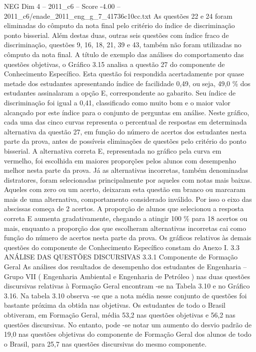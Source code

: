 \begin{textsample}{NEG Dim 4 – 2011\_c6 – Score -4.00 – 2011\_c6/enade\_2011\_eng\_g\_7\_41736c10cc.txt}
As questões 22 e 24 foram eliminadas do cômputo da nota final pelo critério do índice de discriminação ponto bisserial.
Além destas duas, outras seis questões com índice fraco de discriminação, questões 9, 16, 18, 21, 39 e 43, também não foram utilizadas no cômputo da nota final.
A título de exemplo das análises do comportamento das questões objetivas, o Gráfico 3.15 analisa a questão 27 do componente de Conhecimento Específico.
Esta questão foi respondida acertadamente por quase metade dos estudantes apresentando índice de facilidade 0,49, ou seja, 49,0 \% dos estudantes assinalaram a opção E, correspondente ao gabarito.
Seu índice de discriminação foi igual a 0,41, classificado como muito bom e o maior valor alcançado por este índice para o conjunto de perguntas em análise.
Neste gráfico, cada uma das cinco curvas representa o percentual de respostas em determinada alternativa da questão 27, em função do número de acertos dos estudantes nesta parte da prova, antes de possíveis eliminações de questões pelo critério do ponto bisserial.
A alternativa correta E, representada no gráfico pela curva em vermelho, foi escolhida em maiores proporções pelos alunos com desempenho melhor nesta parte da prova.
Já as alternativas incorretas, também denominadas distratores, foram selecionadas principalmente por aqueles com notas mais baixas.
Aqueles com zero ou um acerto, deixaram esta questão em branco ou marcaram mais de uma alternativa, comportamento considerado inválido.
Por isso o eixo das abscissas começa de 2 acertos.
A proporção de alunos que selecionou a resposta correta E aumenta gradativamente, chegando a atingir 100 \% para 18 acertos ou mais, enquanto a proporção dos que escolheram alternativas incorretas cai como função do número de acertos nesta parte da prova.
Os gráficos relativos às demais questões do componente de Conhecimento Específico constam do Anexo I. 3.3 ANÁLISE DAS QUESTÕES DISCURSIVAS 3.3.1 Componente de Formação Geral As análises dos resultados de desempenho dos estudantes de Engenharia – Grupo VII ( Engenharia Ambiental e Engenharia de Petróleo ) nas duas questões discursivas relativas à Formação Geral encontram -se na Tabela 3.10 e no Gráfico 3.16.
Na tabela 3.10 observa -se que a nota média nesse conjunto de questões foi bastante próxima da obtida nas objetivas.
Os estudantes de todo o Brasil obtiveram, em Formação Geral, média 53,2 nas questões objetivas e 56,2 nas questões discursivas.
No entanto, pode -se notar um aumento do desvio padrão de 19,0 nas questões objetivas do componente de Formação Geral dos alunos de todo o Brasil, para 25,7 nas questões discursivas do mesmo componente.

\end{textsample}
